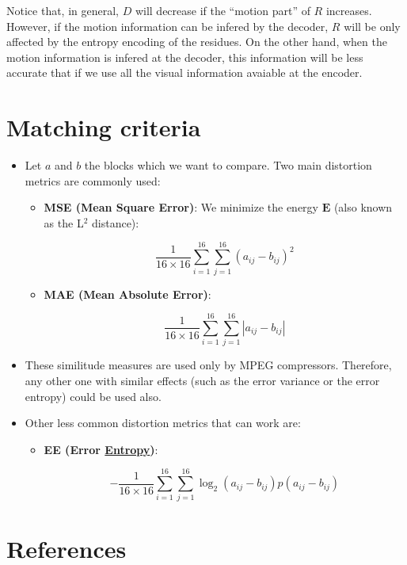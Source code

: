 Notice that, in general, $D$ will decrease if the ``motion part'' of
$R$ increases. However, if the motion information can be infered by
the decoder, $R$ will be only affected by the entropy encoding of the
residues. On the other hand, when the motion information is infered at
the decoder, this information will be less accurate that if we use all
the visual information avaiable at the encoder.


\section{Matching criteria}


\begin{itemize}
\item
  Let $a$ and $b$ the blocks which we want to compare. Two main
  distortion metrics are commonly used:

  \begin{itemize}
  \item
    \textbf{MSE (Mean Square Error)}: We minimize the energy ${\mathbf E}$ (also known as the L$^2$ distance):

    \begin{equation}
      \frac{1}{16\times 16}\sum_{i=1}^{16}\sum_{j=1}^{16}(a_{ij}-b_{ij})^2
    \end{equation}
  \item
    \textbf{MAE (Mean Absolute Error)}:

    \begin{equation}
      \frac{1}{16\times 16}\sum_{i=1}^{16}\sum_{j=1}^{16}|a_{ij}-b_{ij}|
    \end{equation}
  \end{itemize}
\item
  These similitude measures are used only by MPEG compressors.
  Therefore, any other one with similar effects (such as the error
  variance or the error entropy) could be used also.
\item
  Other less common distortion metrics that can work are:

  \begin{itemize}
  \item
    \textbf{EE (Error
    \href{https://en.wikipedia.org/wiki/Entropy_(information_theory)}{Entropy})}:

    \begin{equation}
      -\frac{1}{16\times 16}\sum_{i=1}^{16}\sum_{j=1}^{16}\log_2(a_{ij}-b_{ij})p(a_{ij}-b_{ij})
    \end{equation}
  \end{itemize}
\end{itemize}


\section{References}

\renewcommand{\addcontentsline}[3]{}%


